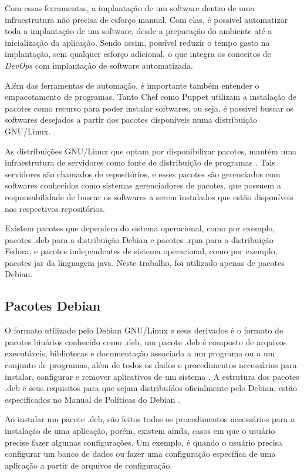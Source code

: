 Com essas ferramentas, a implantação de um software dentro de uma infraestrutura
não precisa de  esforço manual. Com elas, é possível automatizar toda a implantação
de um software, desde a preparação do ambiente até a inicialização da aplicação. 
Sendo assim, possível reduzir o tempo gasto na implantação, sem qualquer esforço
adicional, o que integra os conceitos de \textit{DevOps} com implantação de 
software automatizada.

Além das ferramentas de automação, é importante também entender o empacotamento de
programas. Tanto Chef como Puppet utilizam a instalação de pacotes como recurso para
poder instalar softwares, ou seja, é possível buscar os softwares desejados a partir
dos pacotes disponíveis numa distribuição GNU/Linux. 

As distribuições GNU/Linux que
optam por disponibilizar pacotes, mantém uma infraestrutura de servidores como fonte
de distribuição de programas \cite{araujo2011apprecommender}. Tais servidores são
chamados de repositórios, e esses pacotes são gerenciados com softwares conhecidos
como sistemas gerenciadores de pacotes, que possuem a responsabilidade de buscar
os softwares a serem instalados que estão disponíveis nos respectivos repositórios.

Existem pacotes que dependem do sistema operacional, como por exemplo, pacotes .deb
para a distribuição Debian e pacotes .rpm para a distribuição Fedora, e
pacotes independentes de sistema operacional, como por exemplo, pacotes jar da
linguagem java. Neste trabalho, foi utilizado apenas de pacotes Debian.


\subsection{Pacotes Debian}

O formato utilizado pelo Debian GNU/Linux e seus derivados é o formato de pacotes
binários conhecido como .deb, um pacote .deb é composto de arquivos executáveis,
bibliotecas e documentação associada a um programa ou a um conjunto de programas,
além de todos os dados e procedimentos necessários para instalar, configurar e remover
aplicativos de um sistema \cite{araujo2011apprecommender}. A estrutura dos pacotes 
.deb e seus requisitos para que sejam distribuídos oficialmente pelo Debian,
estão especificados no Manual de Políticas do Debian \cite{debian}.

Ao instalar um pacote .deb, são feitos todos os procedimentos necessários para a instalação
de uma aplicação, porém, existem ainda, casos em que o usuário precise fazer algumas
configurações. Um exemplo, é quando o usuário precisa configurar um banco de dados
ou fazer uma configuração específica de uma aplicação a partir de arquivos de configuração.

